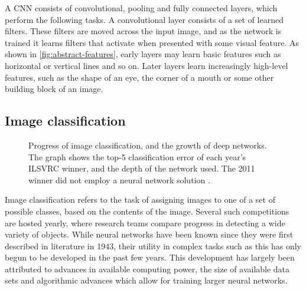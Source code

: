 \documentclass[\rootfolder/main.tex]{subfiles}
\begin{document}
A CNN consists of convolutional, pooling and fully connected layers, which perform the following tasks.
A convolutional layer consists of a set of learned filters.
These filters are moved across the input image, and as the network is trained it learns filters that activate when presented with some visual feature.
As shown in \cref{fig:abstract-features}, early layers may learn basic features such as horizontal or vertical lines and so on.
Later layers learn increasingly high-level features, such as the shape of an eye, the corner of a mouth or some other building block of an image.


\subsection{Image classification}

\begin{figure}
    \caption[The influence of deep learning on image classification error rates.]%
            {Progress of image classification, and the growth of deep networks. %
             The graph shows the top-5 classification error of each year's ILSVRC winner, and the depth of the network used. %
             The 2011 winner did not employ a neural network solution
             \cite{Krizhevsky2012}\cite{Zeiler2013}\cite{Szegedy2014}\cite{He2016}.\label{fig:ilsvrc}}
\end{figure}

Image classification refers to the task of assigning images to one of a set of possible classes, based on the contents of the image.
Several such competitions are hosted yearly, where research teams compare progress in detecting a wide variety of objects.
While neural networks have been known since they were first described in literature in 1943\cite{Mitchell1997}\cite{Mcculloch1943}, their utility in complex tasks such as this has only begun to be developed in the past few years.
This development has largely been attributed to advances in available computing power, the size of available data sets and algorithmic advances which allow for training larger neural networks.
\end{document}
